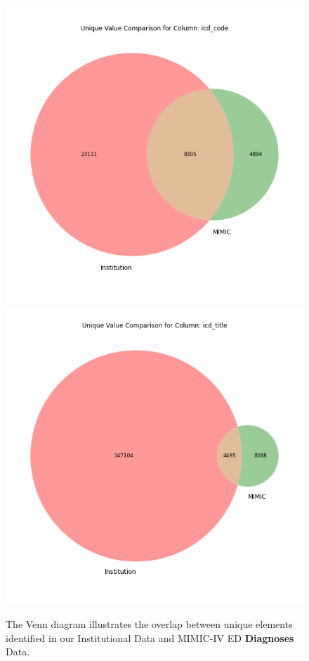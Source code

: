 \documentclass{article}
\theoremstyle{plain}
\theoremstyle{definition}
\theoremstyle{remark}
\begin{document}
 \begin{figure}[h!]
   \centering 
   \includegraphics[width=4.5in]{plots/icd_code_venn.png} 
   \includegraphics[width=4.5in]{plots/icd_title_venn.png} 
   \caption{The Venn diagram illustrates the overlap between unique elements identified in our Institutional Data and MIMIC-IV ED \textbf{Diagnoses} Data.}
   \label{app2} 
 \end{figure} 
\end{document}
